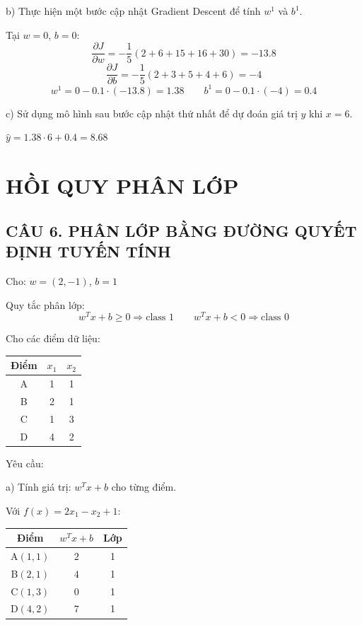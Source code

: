 \documentclass[a4paper,12pt]{article}
\begin{document}
b) Thực hiện một bước cập nhật Gradient Descent để tính $w^1$ và $b^1$.

Tại $w = 0$, $b = 0$:
\[ \frac{\partial J}{\partial w} = -\frac{1}{5}(2 + 6 + 15 + 16 + 30) = -13.8 \]
\[ \frac{\partial J}{\partial b} = -\frac{1}{5}(2 + 3 + 5 + 4 + 6) = -4 \]
\[ w^1 = 0 - 0.1 \cdot (-13.8) = 1.38 \qquad b^1 = 0 - 0.1 \cdot (-4) = 0.4 \]

c) Sử dụng mô hình sau bước cập nhật thứ nhất để dự đoán giá trị $y$ khi $x = 6$.

$\hat{y} = 1.38 \cdot 6 + 0.4 = 8.68$

\section*{HỒI QUY PHÂN LỚP}

\subsection*{CÂU 6. PHÂN LỚP BẰNG ĐƯỜNG QUYẾT ĐỊNH TUYẾN TÍNH}

Cho: $w = (2, -1)$, $b = 1$

Quy tắc phân lớp:
\[ w^T x + b \geq 0 \Rightarrow \text{class } 1 \qquad
   w^T x + b < 0 \Rightarrow \text{class } 0 \]

Cho các điểm dữ liệu:
\begin{center}
\begin{tabular}{|c|c|c|}
\hline
Điểm & $x_1$ & $x_2$ \\
\hline
A & 1 & 1 \\
B & 2 & 1 \\
C & 1 & 3 \\
D & 4 & 2 \\
\hline
\end{tabular}
\end{center}

Yêu cầu:

a) Tính giá trị: $w^T x + b$ cho từng điểm.

Với $f(x) = 2x_1 - x_2 + 1$:
\begin{center}
\begin{tabular}{|c|c|c|}
\hline
Điểm & $w^T x + b$ & Lớp \\
\hline
A$(1,1)$ & $2$ & 1 \\
B$(2,1)$ & $4$ & 1 \\
C$(1,3)$ & $0$ & 1 \\
D$(4,2)$ & $7$ & 1 \\
\hline
\end{tabular}
\end{center}
\end{document}
